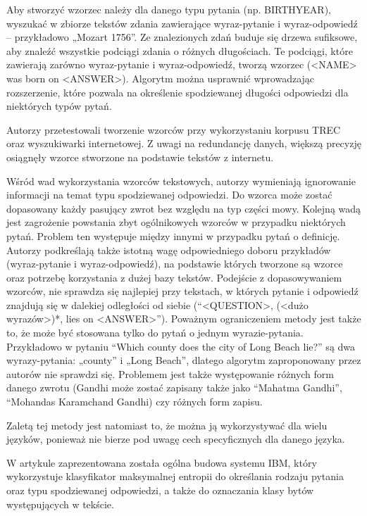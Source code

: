 Aby stworzyć wzorzec należy dla danego typu pytania (np. BIRTHYEAR), wyszukać w zbiorze tekstów zdania zawierające wyraz-pytanie i wyraz-odpowiedź  – przykładowo „Mozart 1756”. Ze znalezionych zdań buduje się drzewa sufiksowe, aby znaleźć wszystkie podciągi zdania o różnych długościach. Te podciągi, które zawierają zarówno wyraz-pytanie i wyraz-odpowiedź, tworzą wzorzec (<NAME> was born on <ANSWER>). Algorytm można usprawnić wprowadzając rozszerzenie, które pozwala na określenie spodziewanej długości odpowiedzi dla niektórych typów pytań. 

Autorzy przetestowali tworzenie wzorców przy wykorzystaniu korpusu TREC oraz wyszukiwarki internetowej. Z uwagi na redundancję danych, większą precyzję osiągnęły wzorce stworzone na podstawie tekstów z internetu. 

Wśród wad wykorzystania wzorców tekstowych, autorzy wymieniają ignorowanie informacji na temat typu spodziewanej odpowiedzi. Do wzorca może zostać dopasowany każdy pasujący zwrot bez względu na typ części mowy. Kolejną wadą jest zagrożenie powstania zbyt ogólnikowych wzorców w przypadku niektórych pytań. Problem ten występuje między innymi w przypadku pytań o definicję. Autorzy podkreślają także istotną wagę odpowiedniego doboru przykładów (wyraz-pytanie i wyraz-odpowiedź), na podstawie których tworzone są wzorce oraz potrzebę korzystania z dużej bazy tekstów. Podejście z dopasowywaniem wzorców, nie sprawdza się najlepiej przy tekstach, w których pytanie i odpowiedź znajdują się w dalekiej odległości od siebie (“<QUESTION>, (<dużo wyrazów>)*, lies on <ANSWER>”). Poważnym ograniczeniem metody jest także to, że może być stosowana tylko do pytań o jednym wyrazie-pytania. Przykładowo w pytaniu “Which county does the city of Long Beach lie?” są dwa wyrazy-pytania: „county” i „Long Beach”, dlatego algorytm zaproponowany przez autorów nie sprawdzi się. Problemem jest także występowanie różnych form danego zwrotu (Gandhi może zostać zapisany także jako “Mahatma Gandhi”, “Mohandas Karamchand Gandhi) czy różnych form zapisu. 

Zaletą tej metody jest natomiast to, że można ją wykorzystywać dla wielu języków, ponieważ nie bierze pod uwagę cech specyficznych dla danego języka.

W artykule \cite{Ittycheriah00ibm'sstatistical} zaprezentowana została ogólna budowa systemu IBM, który wykorzystuje klasyfikator maksymalnej entropii do określania rodzaju pytania oraz typu spodziewanej odpowiedzi, a także do oznaczania klasy bytów występujących w tekście. 

